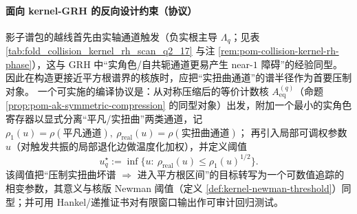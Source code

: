 \begin{remark}
\paragraph{面向 kernel-GRH 的反向设计约束（协议）}
影子谱包的越线首先由实轴通道触发（负实根主导 \(\Lambda_q\)；见表 \ref{tab:fold_collision_kernel_rh_scan_q2_17} 与注 \ref{rem:pom-collision-kernel-rh-phase}），这与 GRH 中“实角色/自共轭通道更易产生 near-\(1\) 障碍”的经验同型。
因此在构造更接近平方根谱界的核族时，应把“实扭曲通道”的谱半径作为首要压制对象。
一个可实施的编译协议是：从对称压缩后的等价计数核 \(A_{\mathrm{eq}}^{(q)}\)（命题 \ref{prop:pom-ak-symmetric-compression} 的同型对象）出发，附加一个最小的实角色寄存器以显式分离“平凡/实扭曲”两类通道，记
\(
\rho_1(u)=\rho(\text{平凡通道}),\ \rho_{\mathrm{real}}(u)=\rho(\text{实扭曲通道})
\)；
再引入局部可调权参数 \(u\)（对触发共振的局部退化边做温度化加权），并定义阈值
\[
u_q^\star:=\inf\{u:\ \rho_{\mathrm{real}}(u)\le \rho_1(u)^{1/2}\}.
\]
该阈值把“压制实扭曲坏谱 \(\Rightarrow\) 进入平方根区间”的目标转写为一个可数值追踪的相变参数，其意义与核版 Newman 阈值（定义 \ref{def:kernel-newman-threshold}）同型；并可用 Hankel/递推证书对有限窗口输出作可审计回归测试。
\end{remark}





